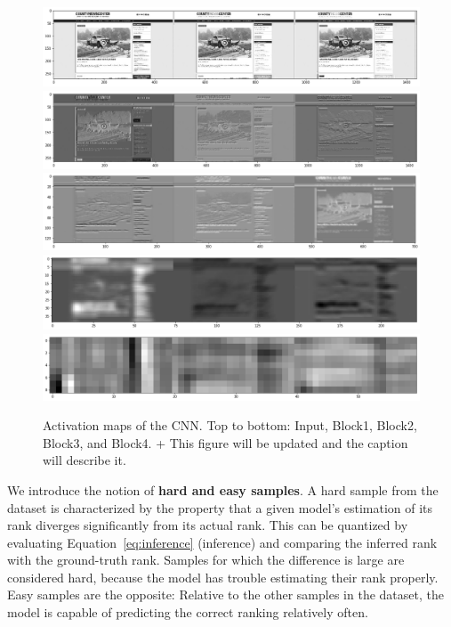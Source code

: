 \begin{figure}
    \centering
    \includegraphics[clip,width=\columnwidth]{resources/analysis/feat-map-28073-0.png}\\
    \includegraphics[clip,width=\columnwidth]{resources/analysis/feat-map-28073-1.png}\\
    \includegraphics[clip,width=\columnwidth]{resources/analysis/feat-map-28073-2.png}\\
    \includegraphics[clip,width=\columnwidth]{resources/analysis/feat-map-28073-3.png}\\
    \includegraphics[clip,width=\columnwidth]{resources/analysis/feat-map-28073-4.png}\\
    \caption[Activation maps of the CNN]{Activation maps of the CNN. Top to bottom: Input, Block1, Block2, Block3, and Block4. + This figure will be updated and the caption will describe it.}
    \label{fig:activationmaps}
\end{figure}

We introduce the notion of \textbf{hard and easy samples}. A hard sample from the dataset is characterized by the property that a given model's estimation of its rank diverges significantly from its actual rank. This can be quantized by evaluating Equation~\ref{eq:inference} (inference) and comparing the inferred rank with the ground-truth rank. Samples for which the difference is large are considered hard, because the model has trouble estimating their rank properly. Easy samples are the opposite: Relative to the other samples in the dataset, the model is capable of predicting the correct ranking relatively often.

